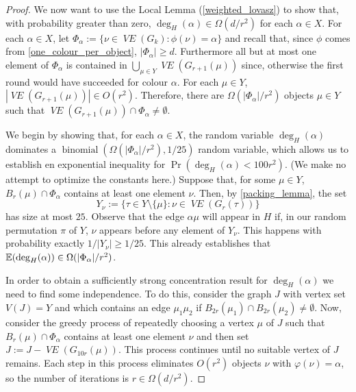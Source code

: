 \documentclass{patmorin}
\DeclareMathOperator{\binomial}{binomial}
\DeclareMathOperator{\VE}{\mathit{VE}}
\begin{document}
\begin{proof}
  We now want to use the Local Lemma (\cref{weighted_lovasz}) to show that, with probability greater than zero, $\deg_H(\alpha)\in \Omega(d/r^2)$ for each $\alpha\in X$.
  For each $\alpha\in X$, let $\Phi_\alpha:=\{\nu\in\VE(G_k):\phi(\nu)=\alpha\}$ and recall that, since $\phi$ comes from \cref{one_colour_per_object}, $|\Phi_\alpha| \ge d$.  Furthermore all but at most one element of $\Phi_\alpha$ is contained in $\bigcup_{\mu\in Y}\VE(G_{r+1}(\mu))$ since, otherwise the first round would have succeeded for colour $\alpha$.  For each $\mu\in Y$, $|\VE(G_{r+1}(\mu))|\in O(r^2)$. Therefore, there are $\Omega(|\Phi_\alpha|/r^2)$ objects $\mu\in Y$ such that $\VE(G_{r+1}(\mu))\cap \Phi_\alpha\neq\emptyset$.

  We begin by showing that, for each $\alpha\in X$, the random variable $\deg_H(\alpha)$ dominates a $\binomial(\Omega(|\Phi_\alpha|/r^2),1/25)$ random variable, which allows us to establish en exponential inequality for $\Pr(\deg_H(\alpha) < 100r^2)$.  (We make no attempt to optimize the constants here.)  Suppose that, for some $\mu\in Y$, $B_r(\mu)\cap \Phi_\alpha$ contains at least one element $\nu$. Then, by \cref{packing_lemma}, the set
  \[
     Y_\nu := \{\tau\in Y\setminus\{\mu\}:\nu\in\VE(G_r(\tau))\}
  \]
  has size at most $25$. Observe that the edge $\alpha\mu$ will appear in $H$ if, in our random permutation $\pi$ of $Y$, $\nu$ appears before any element of $Y_\nu$.  This happens with probability exactly $1/|Y_\nu|\ge 1/25$.  This already establishes that $\mathbb{E}(\deg_H(\alpha)) \in \Omega(|\Phi_\alpha|/r^2)$.

  In order to obtain a sufficiently strong concentration result for $\deg_H(\alpha)$ we need to find some independence.  To do this, consider the graph $J$ with vertex set $V(J)=Y$ and which contains an edge $\mu_1\mu_2$ if $B_{2r}(\mu_1)\cap B_{2r}(\mu_2)\neq\emptyset$.  Now, consider the greedy process of repeatedly choosing a vertex $\mu$ of $J$ such that $B_r(\mu)\cap \Phi_\alpha$ contains at least one element $\nu$ and then set $J:=J-\VE(G_{10r}(\mu))$.  This process continues until no suitable vertex of $J$ remains.  Each step in this process eliminates $O(r^2)$ objects $\nu$ with $\varphi(\nu)=\alpha$, so the number of iterations is $r\in\Omega(d/r^2)$.


\end{proof}
\end{document}
